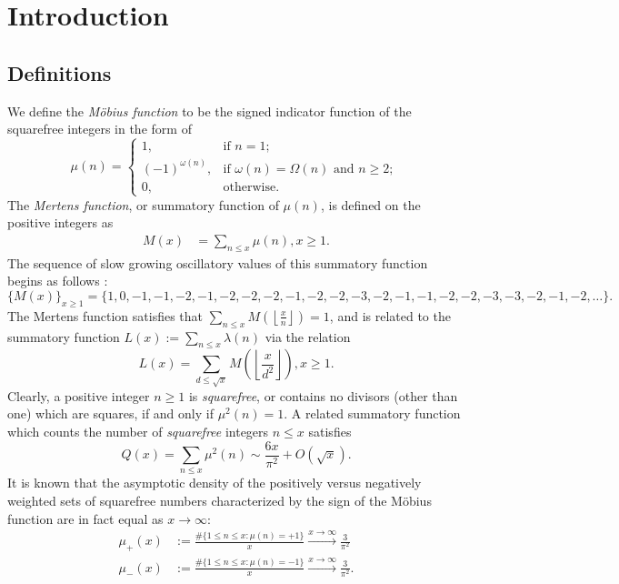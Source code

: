\documentclass[11pt,reqno,a4letter]{article}
\numberwithin{figure}{section}
\numberwithin{table}{section}
\newcommand{\seqnum}[1]{\href{http://oeis.org/#1}{\color{ProcessBlue}{\underline{#1}}}}
\newcommand{\Floor}[2]{\ensuremath{\left\lfloor \frac{#1}{#2} \right\rfloor}}
\theoremstyle{plain}
\numberwithin{theorem}{section}
\theoremstyle{definition}
\begin{document}
\newpage
\section{Introduction} 
\label{subSection_MertensMxClassical_Intro} 

\subsection{Definitions} 

We define the \emph{M\"obius function} to be the signed indicator function 
of the squarefree integers in the form of \cite[\seqnum{A008683}]{OEIS} 
\[
\mu(n) = \begin{cases} 
     1, & \text{if $n = 1$; } \\ 
     (-1)^{\omega(n)}, & \text{if $\omega(n) = \Omega(n)$ and $n \geq 2$; } \\ 
     0, & \text{otherwise.} 
     \end{cases} 
\]
The \emph{Mertens function}, or summatory function of $\mu(n)$, is defined on the 
positive integers as 
\begin{align*} 
M(x) & = \sum_{n \leq x} \mu(n), x \geq 1. 
\end{align*} 
The sequence of slow growing oscillatory values of this 
summatory function begins as follows \cite[\seqnum{A002321}]{OEIS}: 
\[
\{M(x)\}_{x \geq 1} = \{1, 0, -1, -1, -2, -1, -2, -2, -2, -1, -2, -2, -3, -2, 
     -1, -1, -2, -2, -3, -3, -2, -1, -2, \ldots\}. 
\] 
The Mertens function satisfies that $\sum_{n \leq x} M\left(\Floor{x}{n}\right) = 1$, and is related 
to the summatory function $L(x) := \sum_{n \leq x} \lambda(n)$ via the relation 
\cite{HUMPHRIES-JNT-2013,LEHMAN-1960} 
\[
L(x) = \sum_{d \leq \sqrt{x}} M\left(\Floor{x}{d^2}\right), x \geq 1. 
\]
Clearly, a positive integer $n \geq 1$ is \emph{squarefree}, or contains no divisors (other than one) which are 
squares, if and only if $\mu^2(n) = 1$. 
A related summatory function which counts the 
number of \emph{squarefree} integers $n \leq x$ satisfies 
\cite[\S 18.6]{HARDYWRIGHT} \cite[\seqnum{A013928}]{OEIS} 
\[ 
Q(x) = \sum_{n \leq x} \mu^2(n) \sim \frac{6x}{\pi^2} + O\left(\sqrt{x}\right). 
\] 
It is known that the asymptotic density of the positively versus negatively 
weighted sets of squarefree numbers characterized by the sign of the 
M\"obius function are in fact equal as $x \rightarrow \infty$: 
\begin{align*}
\mu_{+}(x) & := \frac{\#\{1 \leq n \leq x: \mu(n) = +1\}}{x} 
     \xrightarrow{x \rightarrow \infty} \frac{3}{\pi^2} \\ 
\mu_{-}(x) & := \frac{\#\{1 \leq n \leq x: \mu(n) = -1\}}{x} 
     \xrightarrow{x \rightarrow \infty} \frac{3}{\pi^2}. 
\end{align*}
\end{document}
